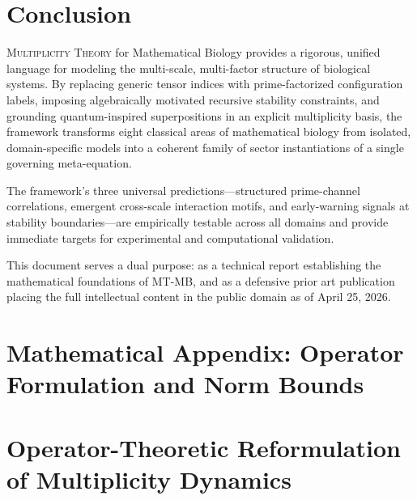 \documentclass[12pt,letterpaper]{article}
\newcommand{\MT}{\textsc{Multiplicity Theory}}
\begin{document}
\section{Conclusion}
\label{sec:conclusion}

\MT{} for Mathematical Biology provides a rigorous, unified language for
modeling the multi-scale, multi-factor structure of biological systems. By
replacing generic tensor indices with prime-factorized configuration labels,
imposing algebraically motivated recursive stability constraints, and grounding
quantum-inspired superpositions in an explicit multiplicity basis, the framework
transforms eight classical areas of mathematical biology from isolated,
domain-specific models into a coherent family of sector instantiations of a
single governing meta-equation.

The framework's three universal predictions---structured prime-channel
correlations, emergent cross-scale interaction motifs, and early-warning
signals at stability boundaries---are empirically testable across all domains
and provide immediate targets for experimental and computational validation.

This document serves a dual purpose: as a technical report establishing the
mathematical foundations of MT-MB, and as a defensive prior art publication
placing the full intellectual content in the public domain as of April 25, 2026.

\appendix
\section*{Mathematical Appendix: Operator Formulation and Norm Bounds}

\setcounter{section}{0}
\renewcommand{\thesection}{A.\arabic{section}}
\renewcommand{\thesubsection}{A.\arabic{subsection}}
\renewcommand{\thetheorem}{A.\arabic{theorem}}
\renewcommand{\thedefinition}{A.\arabic{definition}}
\renewcommand{\theproposition}{A.\arabic{proposition}}
\renewcommand{\thecorollary}{A.\arabic{corollary}}
\renewcommand{\theremark}{A.\arabic{remark}}

\section{Operator-Theoretic Reformulation of Multiplicity Dynamics}
\end{document}
